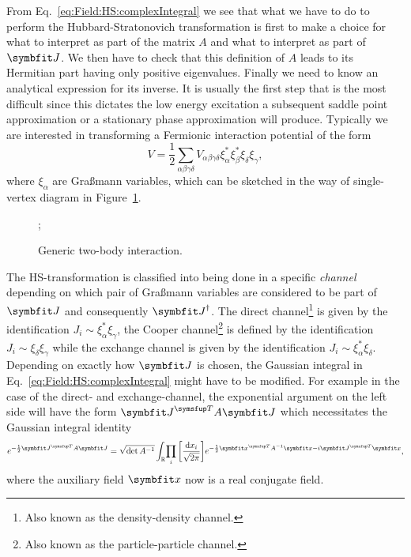From Eq.~\eqref{eq:Field:HS:complexIntegral} we see that
what we have to do to perform the Hubbard-Stratonovich transformation is first to make a choice for what to interpret as part
of the matrix $A$ and what to interpret as part of $\v{J}$. We then have to check that this definition of $A$ leads to its
Hermitian part having only positive eigenvalues. Finally we need to know an analytical expression for its inverse.
It is usually the first step that is the most difficult since this dictates the low energy excitation a subsequent saddle point
approximation or a stationary phase approximation will produce.
Typically we are interested in transforming a Fermionic interaction potential of the form
\begin{equation}
    \label{eq:Field:HS:typicalInteactionPotential}
    V = \frac{1}{2}\sum_{\alpha\beta\gamma\delta}V_{\alpha\beta\gamma\delta}\xi^\ast_\alpha\xi^\ast_\beta\xi_\delta\xi_\gamma,
\end{equation}
where $\xi_\alpha$ are Gra\ss mann variables, which can be sketched in the way of single-vertex diagram in Figure~\ref{fig:Field:HS:twoBodyInteraction}.
\begin{figure}[h]
    \begin{center}

;

    \end{center}
    \caption{Generic two-body interaction.}
    \label{fig:Field:HS:twoBodyInteraction}
\end{figure}
The HS-transformation is classified into being done in a specific \emph{channel} depending on which pair of Gra\ss mann variables are
considered to be part of $\v{J}$ and consequently $\v{J}^\dagger$. The direct channel\footnote{Also known as the density-density channel.} is given by 
the identification $J_i \sim \xi_\alpha^\ast\xi_\gamma$,
the Cooper channel\footnote{Also known as the particle-particle channel.} is defined by the identification $J_i \sim \xi_\delta\xi_\gamma$ while the
exchange channel is given by the identification $J_i \sim \xi_\alpha^\ast\xi_\delta$. Depending on exactly how $\v{J}$ is chosen, the Gaussian
integral in Eq.~\eqref{eq:Field:HS:complexIntegral} might have to be modified. For example in the case of the direct- and exchange-channel, the
exponential argument on the left side will have the form $\v{J}^\trans A\v{J}$ which necessitates the Gaussian integral identity
\begin{equation}
    \label{eq:Field:HS:realIntegral}
    e^{-\frac{1}{2}\v{J}^\trans A\v{J}} = \sqrt{\det A^{-1}}\int_{\mathbb{R}}\!\prod_i\bigg[\frac{\mathrm{d}x_i}{\sqrt{2\pi}}\bigg]e^{-\frac{1}{2}\v{x}^\trans A^{-1}\v{x} - i\v{J}^\trans\v{x}},
\end{equation}
where the auxiliary field $\v{x}$ now is a real conjugate field.


